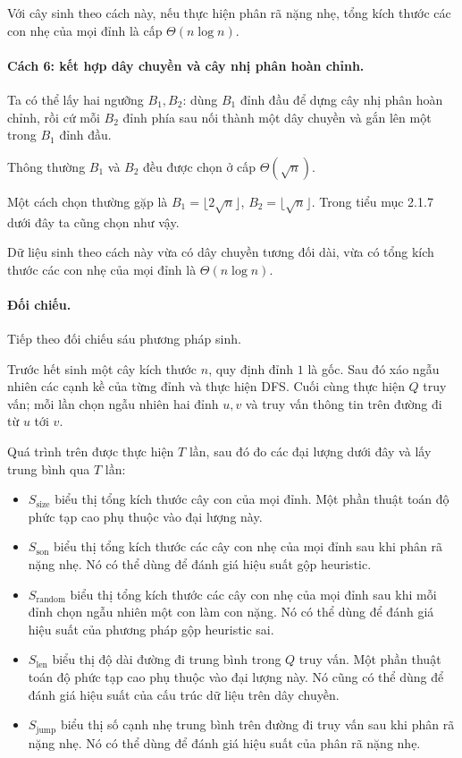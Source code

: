 \documentclass[11pt]{article}
\begin{document}
Với cây sinh theo cách này, nếu thực hiện phân rã nặng nhẹ, tổng kích thước các
con nhẹ của mọi đỉnh là cấp $\Theta(n\log n)$.

\paragraph{Cách 6: kết hợp dây chuyền và cây nhị phân hoàn chỉnh.}
Ta có thể lấy hai ngưỡng $B_1,B_2$: dùng $B_1$ đỉnh đầu để dựng cây nhị phân
hoàn chỉnh, rồi cứ mỗi $B_2$ đỉnh phía sau nối thành một dây chuyền và gắn lên
một trong $B_1$ đỉnh đầu.

Thông thường $B_1$ và $B_2$ đều được chọn ở cấp $\Theta(\sqrt n)$.

Một cách chọn thường gặp là $B_1=\lfloor 2\sqrt n\rfloor$,
$B_2=\lfloor\sqrt n\rfloor$. Trong tiểu mục 2.1.7 dưới đây ta cũng chọn như
vậy.

Dữ liệu sinh theo cách này vừa có dây chuyền tương đối dài, vừa có tổng kích
thước các con nhẹ của mọi đỉnh là $\Theta(n\log n)$.

\paragraph{Đối chiếu.}
Tiếp theo đối chiếu sáu phương pháp sinh.

Trước hết sinh một cây kích thước $n$, quy định đỉnh $1$ là gốc. Sau đó xáo
ngẫu nhiên các cạnh kề của từng đỉnh và thực hiện DFS. Cuối cùng thực hiện $Q$
truy vấn; mỗi lần chọn ngẫu nhiên hai đỉnh $u,v$ và truy vấn thông tin trên
đường đi từ $u$ tới $v$.

Quá trình trên được thực hiện $T$ lần, sau đó đo các đại lượng dưới đây và lấy
trung bình qua $T$ lần:

\begin{itemize}
  \item $S_{\mathrm{size}}$ biểu thị tổng kích thước cây con của mọi đỉnh. Một
  phần thuật toán độ phức tạp cao phụ thuộc vào đại lượng này.
  \item $S_{\mathrm{son}}$ biểu thị tổng kích thước các cây con nhẹ của mọi
  đỉnh sau khi phân rã nặng nhẹ. Nó có thể dùng để đánh giá hiệu suất gộp
  heuristic.
  \item $S_{\mathrm{random}}$ biểu thị tổng kích thước các cây con nhẹ của mọi
  đỉnh sau khi mỗi đỉnh chọn ngẫu nhiên một con làm con nặng. Nó có thể dùng để
  đánh giá hiệu suất của phương pháp gộp heuristic sai.
  \item $S_{\mathrm{len}}$ biểu thị độ dài đường đi trung bình trong $Q$ truy
  vấn. Một phần thuật toán độ phức tạp cao phụ thuộc vào đại lượng này. Nó cũng
  có thể dùng để đánh giá hiệu suất của cấu trúc dữ liệu trên dây chuyền.
  \item $S_{\mathrm{jump}}$ biểu thị số cạnh nhẹ trung bình trên đường đi truy
  vấn sau khi phân rã nặng nhẹ. Nó có thể dùng để đánh giá hiệu suất của phân
  rã nặng nhẹ.
\end{itemize}
\end{document}
